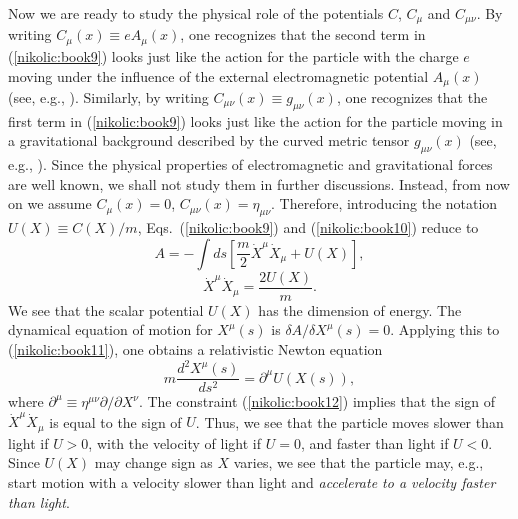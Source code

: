 \documentclass[12pt,twoside]{report} %
\begin{document}
Now we are ready to study the physical role of the potentials $C$, $C_{\mu}$ and $C_{\mu\nu}$.
By writing $C_{\mu}(x)\equiv e A_{\mu}(x)$, one recognizes that the second term in
(\ref{nikolic:book9}) looks just like the action for the particle with the charge $e$ 
moving under the influence of the external electromagnetic potential $A_{\mu}(x)$
(see, e.g., \cite{jackson}). 
Similarly, by writing $C_{\mu\nu}(x)\equiv g_{\mu\nu}(x)$, one recognizes that the first term in
(\ref{nikolic:book9}) looks just like the action for the particle moving in a gravitational
background described by the curved metric tensor $g_{\mu\nu}(x)$ (see, e.g., \cite{weinberg}).
Since the physical properties of electromagnetic and gravitational forces are 
well known, we shall not study them in further discussions. Instead, from now on
we assume $C_{\mu}(x)=0$, $C_{\mu\nu}(x)=\eta_{\mu\nu}$.
Therefore, introducing the notation $U(X)\equiv C(X)/m$,
Eqs.~(\ref{nikolic:book9}) and (\ref{nikolic:book10}) reduce to
\begin{equation}\label{nikolic:book11}
 A=-\int ds \left[ \frac{m}{2} \dot{X}^{\mu} \dot{X}_{\mu} + U(X) \right]  ,
\end{equation}
\begin{equation}\label{nikolic:book12}
 \dot{X}^{\mu}\dot{X}_{\mu}=\frac{2U(X)}{m} .
\end{equation}
We see that the scalar potential $U(X)$ has the dimension of energy.
The dynamical equation of motion for $X^{\mu}(s)$ is 
$\delta A/\delta X^{\mu}(s)=0$. Applying this to (\ref{nikolic:book11}), one obtains
a relativistic Newton equation
\begin{equation}\label{nikolic:book13}
 m\frac{d^2X^{\mu}(s)}{ds^2}=\partial^{\mu}U(X(s)) ,
\end{equation}
where $\partial^{\mu}\equiv \eta^{\mu\nu}\partial/\partial X^{\nu}$.
The constraint (\ref{nikolic:book12}) implies
that the sign of $\dot{X}^{\mu}\dot{X}_{\mu}$ is equal to the sign of
$U$. Thus, we see that the particle moves slower than light if $U>0$,
with the velocity of light if $U=0$, and faster than light if $U<0$. 
Since $U(X)$ may change sign as $X$ varies, we see that the particle may, e.g., 
start motion with a velocity slower than light and {\em accelerate to a velocity
faster than light}.
\end{document}
